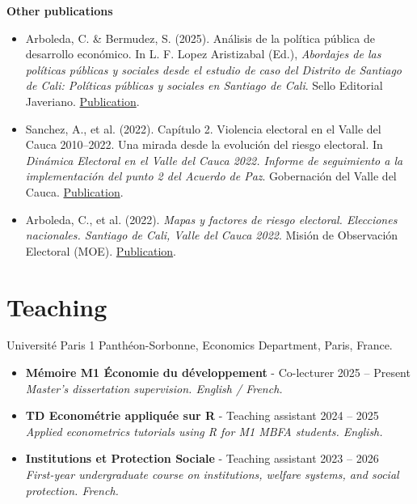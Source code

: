 \documentclass[10pt,a4paper]{article}
\begin{document}
\textbf{Other publications}
\begin{itemize}
\item Arboleda, C. \& Bermudez, S. (2025). Análisis de la política pública de desarrollo económico. In L. F. Lopez Aristizabal (Ed.), \emph{Abordajes de las políticas públicas y sociales desde el estudio de caso del Distrito de Santiago de Cali: Políticas públicas y sociales en Santiago de Cali}. Sello Editorial Javeriano. \href{https://www.javerianacali.edu.co/sello-editorial-javeriano/catalogo/abordajes-de-las-politicas-publicas-y-sociales-desde-el-estudio}{Publication}.
\item Sanchez, A., et al. (2022). Capítulo 2. Violencia electoral en el Valle del Cauca 2010--2022. Una mirada desde la evolución del riesgo electoral. In \emph{Dinámica Electoral en el Valle del Cauca 2022. Informe de seguimiento a la implementación del punto 2 del Acuerdo de Paz}. Gobernación del Valle del Cauca. \href{https://drive.google.com/file/d/1-nd5p33qd4PIDb-MelJUFQ6kCO4dToiT/view}{Publication}.
\item Arboleda, C., et al. (2022). \emph{Mapas y factores de riesgo electoral. Elecciones nacionales. Santiago de Cali, Valle del Cauca 2022}. Misión de Observación Electoral (MOE). \href{https://moe.org.co/wp-content/uploads/2022/03/MRE-2022-Cali_DIGITAL.pdf}{Publication}.
\end{itemize}

\section{Teaching}
Université Paris 1 Panthéon-Sorbonne, Economics Department, Paris, France.
\begin{itemize}
\item \textbf{Mémoire M1 Économie du développement} - Co-lecturer \hfill 2025 -- Present\\
\textit{Master's dissertation supervision. English / French.}
\item \textbf{TD Econométrie appliquée sur R} - Teaching assistant \hfill 2024 -- 2025\\
\textit{Applied econometrics tutorials using R for M1 MBFA students. English.}
\item \textbf{Institutions et Protection Sociale} - Teaching assistant \hfill 2023 -- 2026\\
\textit{First-year undergraduate course on institutions, welfare systems, and social protection. French.}
\end{itemize}
\end{document}
